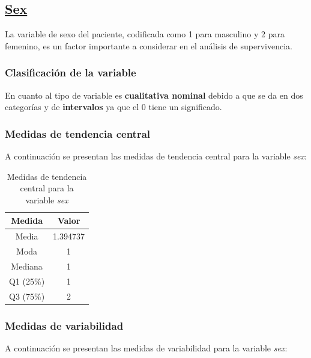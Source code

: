 \documentclass[a4paper,12pt]{article}
\begin{document}
    \subsection*{\underline{Sex}}

    La variable de sexo del paciente, codificada como 1 para masculino y 2 para femenino, es un factor importante a considerar en el análisis de supervivencia.

    \subsubsection*{Clasificación de la variable}

    En cuanto al tipo de variable es \textbf{cualitativa nominal} debido a que se da en dos categorías y de \textbf{intervalos} ya que el 0 tiene un significado.

    \subsubsection*{Medidas de tendencia central}

A continuación se presentan las medidas de tendencia central para la variable \textit{sex}:

\begin{table}[h!]
    \centering
    \begin{tabular}{|c|c|}
        \hline
        \textbf{Medida} & \textbf{Valor} \\
        \hline
        Media & 1.394737 \\
        \hline
        Moda & 1 \\
        \hline
        Mediana & 1 \\
        \hline
        Q1 (25\%) & 1 \\
        \hline
        Q3 (75\%) & 2 \\
        \hline
    \end{tabular}
    \caption{Medidas de tendencia central para la variable \textit{sex}}
    \label{tab:medidas_tendencia_central_sex}
\end{table}

\subsubsection*{Medidas de variabilidad}

A continuación se presentan las medidas de variabilidad para la variable \textit{sex}:
\end{document}
